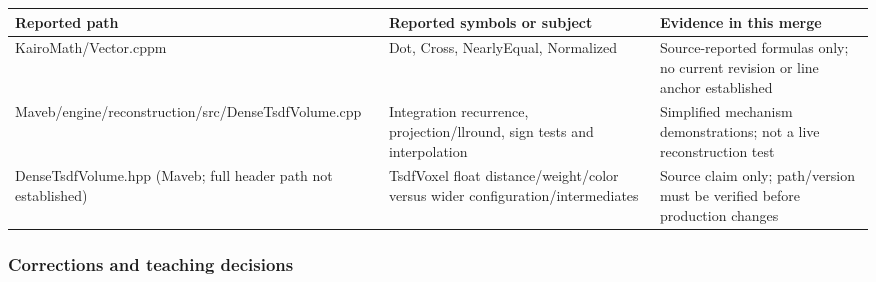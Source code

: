 \hypertarget{appendix-a103e7846d21-repository-excerpts-awaiting-live-verification}{}

{\def\LTcaptype{none} %
\begin{longtable}[]{@{}
  >{\raggedright\arraybackslash}p{}
  >{\raggedright\arraybackslash}p{}
  >{\raggedright\arraybackslash}p{}@{}}
\toprule\noalign{}
\begin{minipage}[b]{\linewidth}\raggedright
Reported path
\end{minipage} & \begin{minipage}[b]{\linewidth}\raggedright
Reported symbols or subject
\end{minipage} & \begin{minipage}[b]{\linewidth}\raggedright
Evidence in this merge
\end{minipage} \\
\midrule\noalign{}
\endhead
\bottomrule\noalign{}
\endlastfoot
KairoMath/Vector.cppm & Dot, Cross, NearlyEqual, Normalized & Source-reported formulas only; no current revision or line anchor established \\
Maveb/engine/reconstruction/src/DenseTsdfVolume.cpp & Integration recurrence, projection/llround, sign tests and interpolation & Simplified mechanism demonstrations; not a live reconstruction test \\
DenseTsdfVolume.hpp (Maveb; full header path not established) & TsdfVoxel float distance/weight/color versus wider configuration/intermediates & Source claim only; path/version must be verified before production changes \\
\end{longtable}
}

\subsubsection{Corrections and teaching decisions}\label{appendix-a103e7846d21-corrections-and-teaching-decisions}

\hypertarget{appendix-a103e7846d21-corrections-and-teaching-decisions}{}

